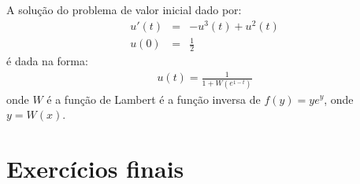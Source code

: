  
 
 
 \begin{ex}[??] A solução do problema de valor inicial dado por:
\begin{eqnarray*}
u'(t)&=&-u^3(t)+u^2(t)\\
u(0)&=&\frac{1}{2}
\end{eqnarray*}
é dada na forma:
\begin{eqnarray*}
u(t)=\frac{1}{1+W(e^{1-t})}
\end{eqnarray*}
onde $W$ é a função de Lambert é a função inversa de $f(y)=ye^y$, onde $y=W(x)$.

\end{ex}

 
 
\section*{Exercícios finais}


